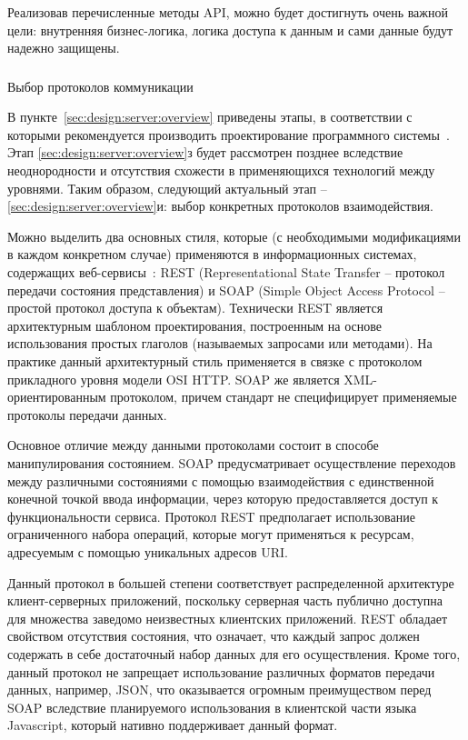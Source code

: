Реализовав перечисленные методы API, можно будет достигнуть очень важной цели: внутренняя бизнес-логика, логика доступа
к данным и сами данные будут надежно защищены.

\subsubsection{} Выбор протоколов коммуникации
\label{sec:design:server:protocols}

В пункте~\ref{sec:design:server:overview} приведены этапы, в соответствии с которыми рекомендуется производить
проектирование программного системы~\cite{application_architecture_guide}. Этап \ref{sec:design:server:overview}з будет
рассмотрен позднее вследствие неоднородности и отсутствия схожести в применяющихся технологий между уровнями.
Таким образом, следующий актуальный этап -- \ref{sec:design:server:overview}и: выбор конкретных протоколов взаимодействия.

Можно выделить два основных стиля, которые (с необходимыми модификациями в каждом конкретном случае) применяются в
информационных системах, содержащих веб-сервисы~\cite{application_architecture_guide}: REST (Representational State
Transfer -- протокол передачи состояния представления) и SOAP (Simple Object Access Protocol -- простой протокол
доступа к объектам). Технически REST является архитектурным шаблоном проектирования, построенным на основе
использования простых глаголов (называемых запросами или методами). На практике данный архитектурный стиль применяется
в связке с протоколом прикладного уровня модели OSI HTTP. SOAP же является XML-ориентированным протоколом, причем
стандарт не специфицирует применяемые протоколы передачи данных.

Основное отличие между данными протоколами состоит в способе манипулирования состоянием. SOAP предусматривает
осуществление переходов между различными состояниями с помощью взаимодействия с единственной конечной точкой ввода
информации, через которую предоставляется доступ к функциональности сервиса. Протокол REST предполагает использование
ограниченного набора операций, которые могут применяться к ресурсам, адресуемым с помощью уникальных адресов URI. 

Данный протокол в большей степени соответствует распределенной архитектуре клиент-серверных приложений, поскольку
серверная часть публично доступна для множества заведомо неизвестных клиентских приложений. REST обладает свойством
отсутствия состояния, что означает, что каждый запрос должен содержать в себе достаточный набор данных для его
осуществления. Кроме того, данный протокол не запрещает использование различных форматов передачи данных,
например, JSON, что оказывается огромным преимуществом перед SOAP вследствие планируемого использования в клиентской
части языка Javascript, который нативно поддерживает данный формат.

